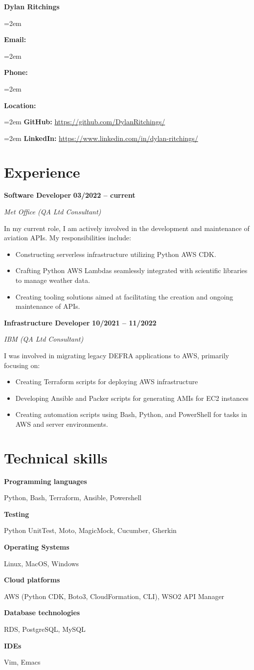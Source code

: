 \documentclass[12pt]{article}
\newlength{\spacebox}
\newcommand{\sepspace}{\vspace*{1em}}
\newcommand{\name}[1]{
\Huge 
\begin{center} \textbf{#1} \end{center}\par
\normalsize}
\newcommand{\info}[2]{
  \noindent\hangindent=2em\hangafter=0
  \parbox{\spacebox}{
    \textbf{#1:}} #2 \par
  }
\newcommand{\link}[2]{
  \noindent\hangindent=2em\hangafter=0
  \textbf{#1:} \url{#2} \par
  }
\newcommand{\skill}[2]{
\noindent\hangafter=0
\begin{minipage}[t]{0.31\textwidth}
  \textbf{#1} 
  \end{minipage}
  \hfill 
  \begin{minipage}[t]{0.6\textwidth}
      #2
  \end{minipage}
  \par
  \vspace*{0.5em}} %
\newcommand{\work}[4]{
  \noindent  \textbf{#1}
  \hfill 
  {
  \centering\textbf{#2}} \par
  \noindent \textit{#3} \par
  \vspace*{0.3em}
  \noindent\hangafter=0 \small #4 
\normalsize \par}
\begin{document}
\name{Dylan Ritchings}
\vspace*{-10pt}

\sepspace
\info{Email}{}
\info{Phone}{}
\info{Location}{}

\sepspace
\link{GitHub}{https://github.com/DylanRitchings/}
\link{LinkedIn}{https://www.linkedin.com/in/dylan-ritchings/}

\section*{Experience}

\work{Software Developer}{03/2022 -- current}{Met Office (QA Ltd Consultant)}
{In my current role, I am actively involved in the development and maintenance of aviation APIs. My responsibilities include:

\begin{itemize}
  \item Constructing serverless infrastructure utilizing Python AWS CDK.
  \item Crafting Python AWS Lambdas seamlessly integrated with scientific libraries to manage weather data.
  \item Creating tooling solutions aimed at facilitating the creation and ongoing maintenance of APIs.
\end{itemize}}

\sepspace

\work{Infrastructure Developer}{10/2021 -- 11/2022}{IBM (QA Ltd Consultant)}
{I was involved in migrating legacy DEFRA applications to AWS, primarily focusing on:
\begin{itemize}
    \item Creating Terraform scripts for deploying AWS infrastructure
    \item Developing Ansible and Packer scripts for generating AMIs for EC2 instances
    \item Creating automation scripts using Bash, Python, and PowerShell for tasks in AWS and server environments.
\end{itemize}}

\section*{Technical skills}

\skill{Programming languages}{Python, Bash, Terraform, Ansible, Powershell}
\skill{Testing}{Python UnitTest, Moto, MagicMock, Cucumber, Gherkin}
\skill{Operating Systems}{Linux, MacOS, Windows}
\skill{Cloud platforms}{AWS (Python CDK, Boto3, CloudFormation, CLI), WSO2 API Manager}
\skill{Database technologies}{RDS, PostgreSQL, MySQL}
\skill{IDEs}{Vim, Emacs}
\end{document}
